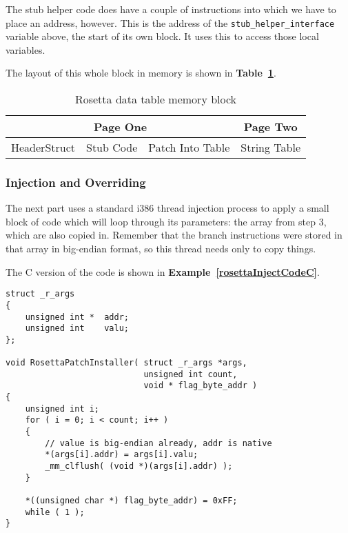 \documentclass[english]{article}
\begin{document}
The stub helper code does have a couple of instructions into which we have to place an address, however. This is the address of the \texttt{stub\_helper\_interface} variable above, the start of its own block. It uses this to access those local variables.

The layout of this whole block in memory is shown in \textbf{Table~\ref{memoryBlock}}.

\begin{table}[h!]
  \begin{center}
    \begin{tabular}{| c | c | c | c |}
      \hline
      \multicolumn{3}{|c|}{Page One} & Page Two \\
      \hline
      HeaderStruct & Stub Code & Patch Into Table & String Table \\
      \hline
    \end{tabular}
  \end{center}
  \caption{Rosetta data table memory block}
  \label{memoryBlock}
\end{table}

\subsubsection{Injection and Overriding}
The next part uses a standard i386 thread injection process to apply a small block of code which will loop through its parameters: the array from step 3, which are also copied in. Remember that the branch instructions were stored in that array in big-endian format, so this thread needs only to copy things.

The C version of the code is shown in \textbf{Example~\ref{rosettaInjectCodeC}}.

\begin{sourcecode}
\begin{verbatim}
struct _r_args
{
    unsigned int *  addr;
    unsigned int    valu;
};

void RosettaPatchInstaller( struct _r_args *args,
                            unsigned int count,
                            void * flag_byte_addr )
{
    unsigned int i;
    for ( i = 0; i < count; i++ )
    {
        // value is big-endian already, addr is native
        *(args[i].addr) = args[i].valu;
        _mm_clflush( (void *)(args[i].addr) );
    }

    *((unsigned char *) flag_byte_addr) = 0xFF;
    while ( 1 );
}
\end{verbatim}
\caption{Injected code, C implementation}
\label{rosettaInjectCodeC}
\end{sourcecode}
\end{document}
